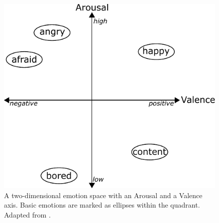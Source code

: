 \documentclass[11pt,a4paper,twoside]{article}
\theoremstyle{thmbreak}
\numberwithin{Theorem}{subsection}
\theoremstyle{defbreak}
\theoremstyle{remark}
\theoremstyle{remark}
\begin{document}
\begin{figure}[ht!]
	\centering
	\includegraphics[scale=0.9]{2DemotionMapping.pdf}
	\caption{A two-dimensional emotion space with an Arousal and a Valence axis. Basic emotions are marked as ellipses within the quadrant. Adapted from \cite{vogt2008automatic}.}
	\label{fig:2.1 2-dimensional emotion space}
\end{figure}
\end{document}
